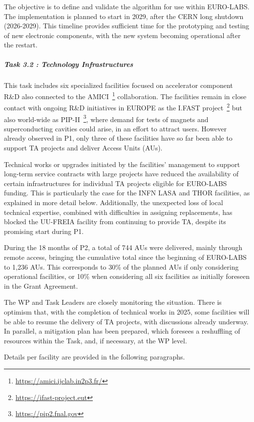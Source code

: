 The objective is to define and validate the algorithm for use within EURO-LABS. The implementation is planned to start in 2029, after the CERN long shutdown (2026-2029). This timeline provides sufficient time for the prototyping and testing of new electronic components, with the new system becoming operational after the restart.

\subparagraph{Task 3.2 : Technology Infrastructures} \mbox{}

This task includes six specialized facilities focused on accelerator component R\&D also connected to the AMICI~\footnote{\url{https://amici.ijclab.in2p3.fr/}} collaboration. The facilities remain in close contact with ongoing R\&D initiatives in EUROPE as the I.FAST project~\footnote{\url{https://ifast-project.eut}} but also world-wide as PIP-II~\footnote{\url{https://pip2.fnal.gov}}, where demand for tests of magnets and superconducting cavities could arise, in an effort to attract users. However already observed in P1, only three of these facilities have so far been able to support TA projects and deliver Access Units (AUs).

Technical works or upgrades initiated by the facilities' management to support long-term service contracts with large projects have reduced the availability of certain infrastructures for individual TA projects eligible for EURO-LABS funding. This is particularly the case for the INFN LASA and THOR facilities, as explained in more detail below. Additionally, the unexpected loss of local technical expertise, combined with difficulties in assigning replacements, has blocked the UU-FREIA facility from continuing to provide TA, despite its promising start during P1.

During the 18 months of P2, a total of 744 AUs were delivered, mainly through remote access, bringing the cumulative total since the beginning of EURO-LABS to 1,236 AUs. This corresponds to 30\% of the planned AUs if only considering operational facilities, or 10\% when considering all six facilities as initially foreseen in the Grant Agreement.

The WP and Task Leaders are closely monitoring the situation. There is optimism that, with the completion of technical works in 2025, some facilities will be able to resume the delivery of TA projects, with discussions already underway. In parallel, a mitigation plan has been prepared, which foresees a reshuffling of resources within the Task, and, if necessary, at the WP level.

Details per facility are provided in the following paragraphs.

